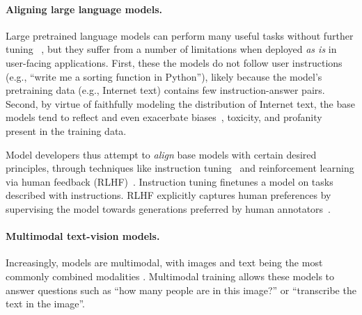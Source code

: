 \documentclass{article}
\renewcommand{\cite}{\citep}
\begin{document}
\paragraph{Aligning large language models.~}
Large pretrained language models can perform many useful tasks without further tuning ~\cite{brown2020language}, but they suffer from a number of limitations when deployed \emph{as is} in user-facing applications.
First, these the models do not follow user instructions (e.g., ``write me a sorting function in Python''), likely because the model's pretraining data (e.g., Internet text) contains few instruction-answer pairs.
Second, by virtue of faithfully modeling the distribution of Internet text, the base models tend to reflect and even exacerbate biases~\cite{abid2021large}, toxicity, and profanity~\cite{welbl2021challenges, dixon2018bias} present in the training data. %

Model developers thus attempt to \emph{align} base models with certain desired principles, through techniques like instruction tuning~\cite{wei2022finetuned, ouyang2022training} and reinforcement learning via human feedback (RLHF)~\cite{christiano2023deep, bai2022training}. Instruction tuning finetunes a model on tasks described with instructions. %
RLHF explicitly captures human preferences by supervising the model towards generations preferred by human annotators~\citep{christiano2023deep}.



\paragraph{Multimodal text-vision models.~}
Increasingly, models are multimodal, with images and text being the most commonly combined modalities \citep{gpt4, gemini,llava,minigpt4}. 
%
%
Multimodal training allows these models to answer questions such as ``how many people are in this image?''
or ``transcribe the text in the image''.
\end{document}
